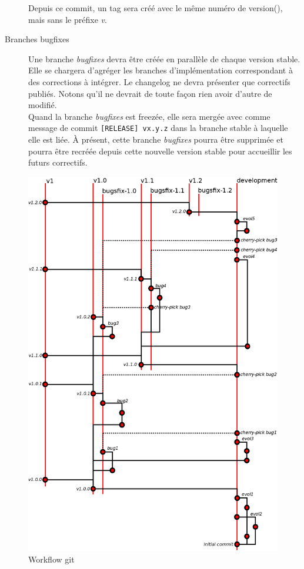 \begin{description}
		Depuis ce commit, un tag sera créé avec le même numéro de version(), mais sans le préfixe \emph{v}.
	\item[Branches bugfixes]
		Une branche \emph{bugfixes} devra être créée en parallèle de chaque version stable.
		Elle se chargera d'agréger les branches d'implémentation correspondant à des corrections à intégrer.
		Le changelog ne devra présenter que correctifs publiés.
		Notons qu'il ne devrait de toute façon rien avoir d'autre de modifié.\\

		Quand la branche \emph{bugfixes} est freezée, elle sera mergée avec comme message de commit {\tt[RELEASE] vx.y.z} dans la branche stable à laquelle elle est liée.
		À présent, cette branche \emph{bugfixes} pourra être supprimée et pourra être recréée depuis cette nouvelle version stable pour accueillir les futurs correctifs.
\end{description}

\begin{figure}
	\centering
	\includegraphics[scale=0.3]{part/developpement/code/fig_workflow_git.png}
	\caption{Workflow git}
	\label{fig_3.2_git}
\end{figure}
